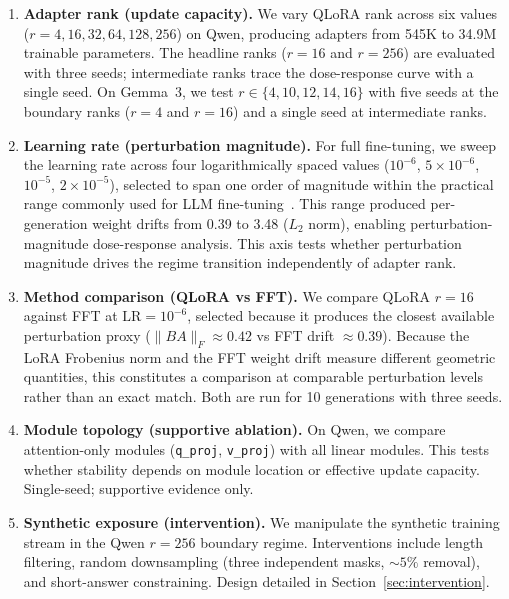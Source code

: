 \documentclass[a4paper,fleqn]{cas-dc}
\begin{document}
\begin{enumerate}
\item \textbf{Adapter rank (update capacity).} We vary QLoRA rank across six
values ($r=4,16,32,64,128,256$) on Qwen, producing adapters from 545K to 34.9M
trainable parameters. The headline ranks ($r=16$ and $r=256$) are evaluated with
three seeds; intermediate ranks trace the dose-response curve with a single
seed. On Gemma~3, we test $r \in \{4,10,12,14,16\}$ with five seeds at the
boundary ranks ($r=4$ and $r=16$) and a single seed at intermediate ranks.

\item \textbf{Learning rate (perturbation magnitude).} For full fine-tuning, we
sweep the learning rate across four logarithmically spaced values ($10^{-6}$,
$5{\times}10^{-6}$, $10^{-5}$, $2{\times}10^{-5}$), selected to span one
order of magnitude within the practical range commonly used for LLM
fine-tuning~\citep{hu2022,dettmers2023}. This range produced per-generation
weight drifts from 0.39 to 3.48 ($L_2$ norm), enabling perturbation-magnitude
dose-response analysis. This axis tests whether
perturbation magnitude drives the regime transition independently of adapter
rank.

\item \textbf{Method comparison (QLoRA vs FFT).} We compare QLoRA $r=16$
against FFT at $\mathrm{LR}=10^{-6}$, selected because it produces the closest
available perturbation proxy ($\|BA\|_F \approx 0.42$ vs FFT drift $\approx
0.39$). Because the LoRA Frobenius norm and the FFT weight drift measure
different geometric quantities, this constitutes a comparison at comparable
perturbation levels rather than an exact match. Both
are run for 10 generations with three seeds.

\item \textbf{Module topology (supportive ablation).} On Qwen, we compare
attention-only modules (\texttt{q\_proj}, \texttt{v\_proj}) with all linear
modules. This tests whether stability depends on module location or effective
update capacity. Single-seed; supportive evidence only.

\item \textbf{Synthetic exposure (intervention).} We manipulate the synthetic
training stream in the Qwen $r=256$ boundary regime. Interventions include
length filtering, random downsampling (three independent masks, ${\sim}5\%$
removal), and short-answer constraining. Design detailed in
Section~\ref{sec:intervention}.
\end{enumerate}
\end{document}
